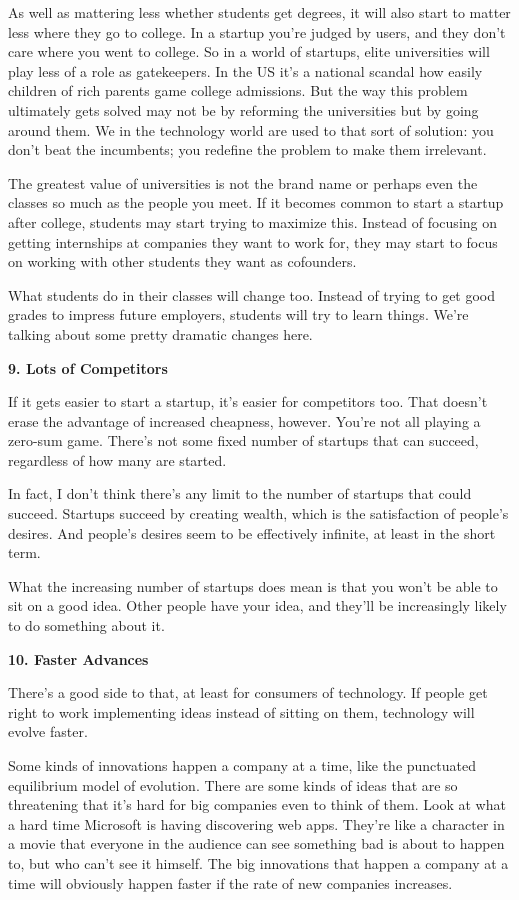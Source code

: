 \documentclass[12pt]{book}
\begin{document}
As well as mattering less whether students get degrees, it will also
start to matter less where they go to college. In a startup you're
judged by users, and they don't care where you went to college. So in a
world of startups, elite universities will play less of a role as
gatekeepers. In the US it's a national scandal how easily children of
rich parents game college admissions. But the way this problem
ultimately gets solved may not be by reforming the universities but by
going around them. We in the technology world are used to that sort of
solution: you don't beat the incumbents; you redefine the problem to
make them irrelevant.

The greatest value of universities is not the brand name or perhaps even
the classes so much as the people you meet. If it becomes common to
start a startup after college, students may start trying to maximize
this. Instead of focusing on getting internships at companies they want
to work for, they may start to focus on working with other students they
want as cofounders.

What students do in their classes will change too. Instead of trying to
get good grades to impress future employers, students will try to learn
things. We're talking about some pretty dramatic changes here.

\textbf{9. Lots of Competitors}

If it gets easier to start a startup, it's easier for competitors too.
That doesn't erase the advantage of increased cheapness, however. You're
not all playing a zero-sum game. There's not some fixed number of
startups that can succeed, regardless of how many are started.

In fact, I don't think there's any limit to the number of startups that
could succeed. Startups succeed by creating wealth, which is the
satisfaction of people's desires. And people's desires seem to be
effectively infinite, at least in the short term.

What the increasing number of startups does mean is that you won't be
able to sit on a good idea. Other people have your idea, and they'll be
increasingly likely to do something about it.

\textbf{10. Faster Advances}

There's a good side to that, at least for consumers of technology. If
people get right to work implementing ideas instead of sitting on them,
technology will evolve faster.

Some kinds of innovations happen a company at a time, like the
punctuated equilibrium model of evolution. There are some kinds of ideas
that are so threatening that it's hard for big companies even to think
of them. Look at what a hard time Microsoft is having discovering web
apps. They're like a character in a movie that everyone in the audience
can see something bad is about to happen to, but who can't see it
himself. The big innovations that happen a company at a time will
obviously happen faster if the rate of new companies increases.
\end{document}
